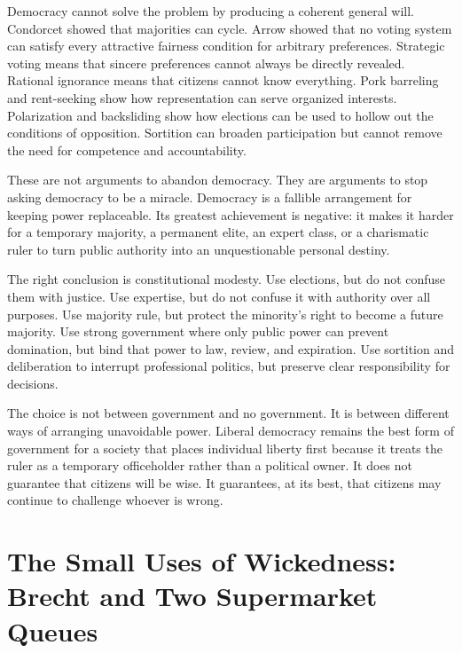﻿\documentclass[12pt,a4paper]{book}
\begin{document}
Democracy cannot solve the problem by producing a coherent general will.
Condorcet showed that majorities can cycle.  Arrow showed that no voting
system can satisfy every attractive fairness condition for arbitrary
preferences.  Strategic voting means that sincere preferences cannot always
be directly revealed.  Rational ignorance means that citizens cannot know
everything.  Pork barreling and rent-seeking show how representation can
serve organized interests.  Polarization and backsliding show how elections
can be used to hollow out the conditions of opposition.  Sortition can
broaden participation but cannot remove the need for competence and
accountability.

These are not arguments to abandon democracy.  They are arguments to stop
asking democracy to be a miracle.  Democracy is a fallible arrangement for
keeping power replaceable.  Its greatest achievement is negative: it makes
it harder for a temporary majority, a permanent elite, an expert class, or a
charismatic ruler to turn public authority into an unquestionable personal
destiny.

The right conclusion is constitutional modesty.  Use elections, but do not
confuse them with justice.  Use expertise, but do not confuse it with
authority over all purposes.  Use majority rule, but protect the minority's
right to become a future majority.  Use strong government where only public
power can prevent domination, but bind that power to law, review, and
expiration.  Use sortition and deliberation to interrupt professional
politics, but preserve clear responsibility for decisions.

The choice is not between government and no government.  It is between
different ways of arranging unavoidable power.  Liberal democracy remains
the best form of government for a society that places individual liberty
first because it treats the ruler as a temporary officeholder rather than a
political owner.  It does not guarantee that citizens will be wise.  It
guarantees, at its best, that citizens may continue to challenge whoever is
wrong.

% 


\chapter[The Small Uses of Wickedness]{The Small Uses of Wickedness: Brecht and Two Supermarket Queues}
\end{document}

